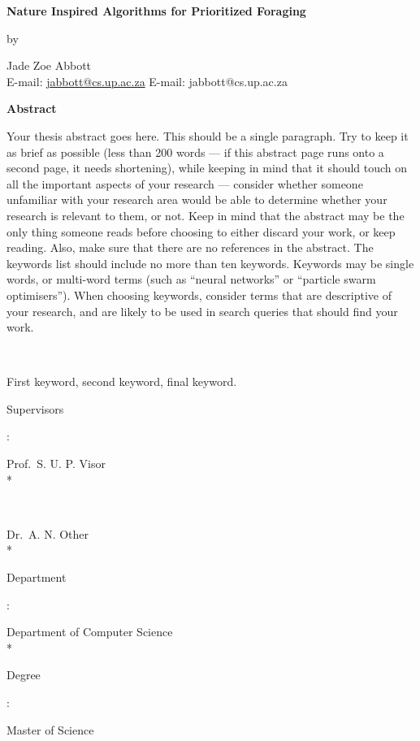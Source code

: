 
\newpage

\begin{center}
	{\large\bf Nature Inspired Algorithms for Prioritized Foraging}
\end{center}
\begin{center}by\end{center}
\begin{center}
	{Jade Zoe Abbott}\\
	\ifpdf
		E-mail: \href{mailto:jabbott@cs.up.ac.za}{jabbott@cs.up.ac.za}
	\else
		E-mail: jabbott@cs.up.ac.za
	\fi
\end{center}
\vspace{1cm}
\begin{center}{\large\bf Abstract}\end{center}
Your thesis abstract goes here. This should be a single paragraph. Try to keep it as brief as possible (less than 200 words --- if this abstract page runs onto a second page, it needs shortening), while keeping in mind that it should touch on all the important aspects of your research --- consider whether someone unfamiliar with your research area would be able to determine whether your research is relevant to them, or not. Keep in mind that the abstract may be the only thing someone reads before choosing to either discard your work, or keep reading. Also, make sure that there are no references in the abstract. The keywords list should include no more than ten keywords. Keywords may be single words, or multi-word terms (such as ``neural networks'' or ``particle swarm optimisers''). When choosing keywords, consider terms that are descriptive of your research, and are likely to be used in search queries that should find your work.

\noindent\

 First keyword, second keyword, final keyword.

\vfill
\noindent
{\bf\parbox{26.8mm}{Supervisors}:} Prof.~S. U. P. Visor \\* %
{\bf\parbox{28.55mm}{~}} Dr.~A. N. Other \\*
{\bf\parbox{26.8mm}{Department}:} Department of Computer Science \\*
{\bf\parbox{26.8mm}{Degree}:} Master of Science

